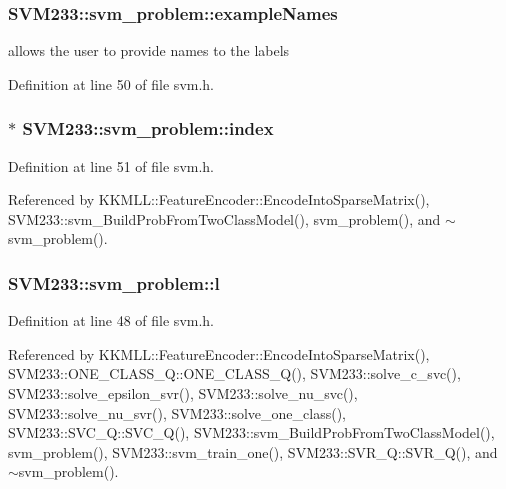 \subsubsection[{\texorpdfstring{example\+Names}{exampleNames}}]{ S\+V\+M233\+::svm\+\_\+problem\+::example\+Names}\hypertarget{struct_s_v_m233_1_1svm__problem_a5d86ac405294437f5a2da3a0e90d7bd5}{}\label{struct_s_v_m233_1_1svm__problem_a5d86ac405294437f5a2da3a0e90d7bd5}
allows the user to provide names to the labels 

Definition at line 50 of file svm.\+h.

\subsubsection[{\texorpdfstring{index}{index}}]{$\ast$ S\+V\+M233\+::svm\+\_\+problem\+::index}\hypertarget{struct_s_v_m233_1_1svm__problem_a4769752a28a7f99fa469fed248762504}{}\label{struct_s_v_m233_1_1svm__problem_a4769752a28a7f99fa469fed248762504}


Definition at line 51 of file svm.\+h.



Referenced by K\+K\+M\+L\+L\+::\+Feature\+Encoder\+::\+Encode\+Into\+Sparse\+Matrix(), S\+V\+M233\+::svm\+\_\+\+Build\+Prob\+From\+Two\+Class\+Model(), svm\+\_\+problem(), and $\sim$svm\+\_\+problem().

\subsubsection[{\texorpdfstring{l}{l}}]{ S\+V\+M233\+::svm\+\_\+problem\+::l}\hypertarget{struct_s_v_m233_1_1svm__problem_a8e80c00adc45517f894b19ce879a0405}{}\label{struct_s_v_m233_1_1svm__problem_a8e80c00adc45517f894b19ce879a0405}


Definition at line 48 of file svm.\+h.



Referenced by K\+K\+M\+L\+L\+::\+Feature\+Encoder\+::\+Encode\+Into\+Sparse\+Matrix(), S\+V\+M233\+::\+O\+N\+E\+\_\+\+C\+L\+A\+S\+S\+\_\+\+Q\+::\+O\+N\+E\+\_\+\+C\+L\+A\+S\+S\+\_\+\+Q(), S\+V\+M233\+::solve\+\_\+c\+\_\+svc(), S\+V\+M233\+::solve\+\_\+epsilon\+\_\+svr(), S\+V\+M233\+::solve\+\_\+nu\+\_\+svc(), S\+V\+M233\+::solve\+\_\+nu\+\_\+svr(), S\+V\+M233\+::solve\+\_\+one\+\_\+class(), S\+V\+M233\+::\+S\+V\+C\+\_\+\+Q\+::\+S\+V\+C\+\_\+\+Q(), S\+V\+M233\+::svm\+\_\+\+Build\+Prob\+From\+Two\+Class\+Model(), svm\+\_\+problem(), S\+V\+M233\+::svm\+\_\+train\+\_\+one(), S\+V\+M233\+::\+S\+V\+R\+\_\+\+Q\+::\+S\+V\+R\+\_\+\+Q(), and $\sim$svm\+\_\+problem().


